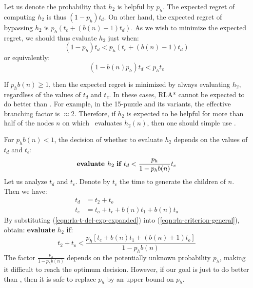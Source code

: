 Let us denote the probability that $h_2$ is helpful by
$p_h$. The expected regret of computing $h_2$ is thus $(1-p_h) t_d$.
On other hand, the expected regret of bypassing $h_2$ is $p_h(
t_e+(b(n)-1)t_d)$. As we wish to minimize the expected regret, we should thus evaluate $h_2$ just when:
\begin{equation}
(1-p_h) t_d < p_h (t_e+(b(n)-1)t_d)
\end{equation}
or equivalently:
\begin{equation}
(1-b(n) p_h) t_d < p_h t_e
\end{equation}

If $p_h b(n) \ge 1$, then the expected regret is minimized by always
evaluating $h_2$, regardless of the values of $t_d$ and $t_e$.
In these cases, RLA* cannot be expected to do better than \lazyastar.
For example, in the 15-puzzle and its variants, the
effective branching factor is $\approx 2$. Therefore, if $h_2$ is expected to be helpful for more than half of the nodes $n$
on which \lazyastar~evaluates $h_2(n)$, then one should simple use \lazyastar.

For $p_h b(n) < 1$,  the decision of whether to evaluate $h_2$
depends on the values of $t_d$ and $t_e$:
\begin{equation}
\mbox{\bf evaluate }h_2\mbox{ \bf if }t_d<\frac {p_h} {1-p_hb(n)} t_e
\label{eqn:rla-criterion-general}
\end{equation}
Let us analyze $t_d$ and $t_e$. Denote by
$t_c$ the time to generate the children of $n$. Then we have:
\begin{align}
t_d&=t_2+t_o\nonumber\\
t_e&=t_o + t_c+b (n) t_1 + b(n) t_o
\label{eqn:rla-t-del-exp-expanded}
\end{align}
By substituting
(\ref{eqn:rla-t-del-exp-expanded}) into (\ref{eqn:rla-criterion-general}), obtain: {\bf evaluate} $h_2$ {\bf if}:
\begin{equation}
{t_2+t_o}<\frac {p_h \left[{t_c} + b (n)t_1+(b(n)+1){t_o}\right]} {1-p_hb(n)}
\label{eqn:rla-criterion-expanded}
\end{equation}
The factor $\frac {p_h} {1-p_hb(n)}$ depends on the potentially unknown
probability $p_h$, making it difficult to reach the optimum decision.
However, if our goal is just to do better than \lazyastar, then it is safe to replace $p_h$ by an upper bound on $p_h$.


